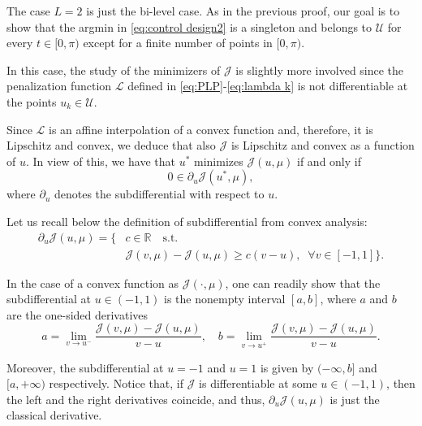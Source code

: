 \documentclass[9pt,shortpaper,twoside,web]{ieeecolor}
\begin{document}
The case $L=2$ is just the bi-level case. As in the previous proof, our goal is to show that the argmin in \eqref{eq:control design2} is a singleton and belongs to $\mathcal{U}$ for every $t\in [0,\pi)$ except for a finite number of points in $[0,\pi)$.

In this case, the study of the minimizers of $\mathcal{J}$ is slightly more involved since the penalization function $\mathcal{L}$ defined in \eqref{eq:PLP}-\eqref{eq:lambda k} is not differentiable at the points $u_k\in\mathcal U$.

Since $\mathcal{L}$ is an affine interpolation of a convex function and, therefore, it is Lipschitz and convex, we deduce that also $\mathcal{J}$ is Lipschitz and convex as a function of $u$. In view of this, we have that $u^\ast$ minimizes $\mathcal{J} (u,\mu)$ if and only if
\begin{equation}\label{opti cond subdiff}
	0\in \partial_u \mathcal{J} (u^\ast,\mu),
\end{equation}
where $\partial_u$ denotes the subdifferential with respect to $u$. 

Let us recall below the definition of subdifferential from convex analysis:
\begin{align*}
	\partial_u \mathcal{J} (u,\mu) = \{  & c\in \mathbb{R} \quad \text{s.t.} 
	\\
	&\mathcal{J} (v,\mu) - \mathcal{J} (u,\mu) \geq c(v-u),\;\; \forall v\in [-1,1] \}. 
\end{align*}

In the case of a convex function as $\mathcal{J}(\cdot, \mu)$, one can readily show that the subdifferential at $u\in (-1,1)$ is the nonempty interval $[a,b]$, where $a$ and $b$ are the one-sided derivatives
\begin{equation*}
	a = \displaystyle\lim_{v\to u^-} \dfrac{\mathcal{J} (v,\mu) - \mathcal{J}(u,\mu)}{v-u}, \quad b = \displaystyle\lim_{v\to u^+} \dfrac{\mathcal{J} (v,\mu) - \mathcal{J}(u,\mu)}{v-u}. 
\end{equation*}

Moreover, the subdifferential at $u=-1$ and $u=1$ is given by $(-\infty, b]$ and $[a,+\infty)$ respectively.
Notice that, if $\mathcal J$ is differentiable at some $u\in (-1,1)$, then the left and the right derivatives coincide, and thus, $\partial_u \mathcal{J}(u,\mu)$ is just the classical derivative.
\end{document}
